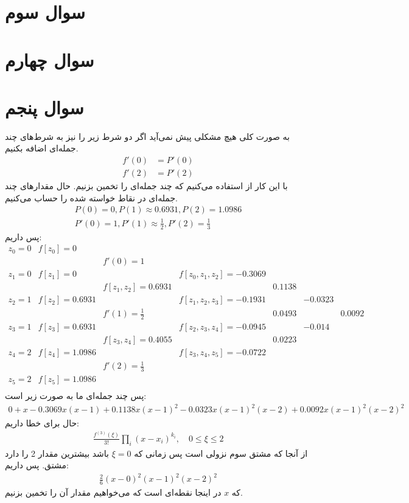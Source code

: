 \documentclass[]{article}
\begin{document}
\section*{سوال سوم}
\section*{سوال چهارم}
\section*{سوال پنجم}
به صورت کلی هیچ مشکلی پیش نمی‌آید اگر دو شرط زیر را نیز به شرط‌های چند جمله‌ای اضافه بکنیم.
\begin{align*}
    f'(0) &= P'(0)\\
    f'(2) &= P'(2)
\end{align*}
با این کار از
استفاده می‌کنیم که چند جمله‌ای را تخمین بزنیم.
حال مقدار‌های چند جمله‌ای در نقاط خواسته شده را حساب می‌کنیم.
\begin{gather*}
    P(0) = 0, P(1) \approx 0.6931, P(2) = 1.0986\\
    P'(0) = 1, P'(1) \approx \frac{1}{2}, P'(2) = \frac{1}{3}
\end{gather*}
پس داریم:
\[
\begin{array}{ccccccc}
z_0 = 0 & f[z_0] = 0 \\
&& f'(0) = 1 \\
z_1 = 0 & f[z_1] = 0 && f[z_0,z_1,z_2] = -0.3069\\
&& f[z_1,z_2] = 0.6931 && 0.1138\\
z_2 = 1 & f[z_2] = 0.6931 && f[z_1,z_2,z_3] = -0.1931 && -0.0323\\
&& f'(1) = \frac{1}{2} && 0.0493 && 0.0092\\
z_3 = 1 & f[z_3] = 0.6931 && f[z_2,z_3,z_4] = -0.0945 && -0.014 \\
&& f[z_3,z_4] = 0.4055 && 0.0223 \\
z_4 = 2 & f[z_4] = 1.0986&&f[z_3,z_4,z_5] = -0.0722\\
&&f'(2) = \frac{1}{3}\\
z_5 = 2 & f[z_5] = 1.0986\\
\end{array}
\]
پس چند جمله‌ای ما به صورت زیر است:
\begin{gather*}
    0 + x -0.3069 x (x-1) + 0.1138 x (x-1)^2 -0.0323 x (x-1)^2 (x-2) + 0.0092 x (x-1)^2 (x-2)^2
\end{gather*}
حال برای خطا داریم:
\begin{gather*}
    \frac{f^{(3)}(\xi)}{3!}\prod_i(x - x_i)^{k_i}, \quad 0 \le \xi \le 2
\end{gather*}
از آنجا که مشتق سوم نزولی است پس زمانی که
$\xi = 0$
باشد بیشترین مقدار 2 را دارد مشتق. پس داریم:
\begin{gather*}
    \frac{2}{6} (x - 0)^2 (x - 1)^2 (x - 2)^2 
\end{gather*}
که
$x$
در اینجا نقطه‌‌ای است که می‌خواهیم مقدار آن را تخمین بزنیم.
\end{document}
